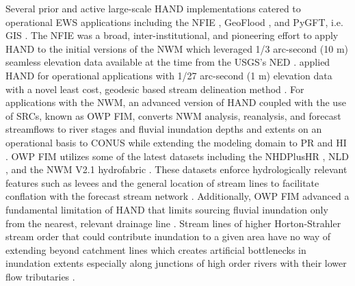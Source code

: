 \documentclass[water,article,submit,pdftex,moreauthors]{dependencies/Definitions/mdpi}
\begin{document}
Several prior and active large-scale \ac{HAND} implementations catered to operational \ac{EWS} applications including the \ac{NFIE} \cite{maidment2017conceptual,liu2016cybergis,liu2018cybergis}, GeoFlood \cite{zheng2018geoflood,hocini2021performance,d2022identification,carruthers2021assessment,zheng2022application}, and \ac{PyGFT}, i.e. \ac{GIS} \cite{petrochenkov2020pygft,verdin2016software}.
The \ac{NFIE} was a broad, inter-institutional, and pioneering effort to apply HAND to the initial versions of the \ac{NWM} which leveraged 1/3 arc-second (10 \ac{m}) seamless elevation data available at the time \cite{maidment2017conceptual,liu2016cybergis,liu2018cybergis} from the \ac{USGS}'s \ac{NED} \cite{gesch2002national,gesch2007digital}.
\citet{zheng2018geoflood} applied HAND for operational applications with 1/27 arc-second (1 \ac{m}) elevation data with a novel least cost, geodesic based stream delineation method \cite{passalacqua2010geometric,passalacqua2012automatic,zheng2018geoflood,zheng2019automatic,carruthers2021assessment,d2022identification,zheng2022application}.
For applications with the \ac{NWM}, an advanced version of \ac{HAND} coupled with the use of \acp{SRC}, known as \ac{OWP} \ac{FIM}, converts \ac{NWM} analysis, reanalysis, and forecast streamflows to river stages and fluvial inundation depths and extents on an operational basis to \ac{CONUS} while extending the modeling domain to \ac{PR} and \ac{HI} \cite{aristizabal2022extending,inundationMapping2022}.
\ac{OWP} \ac{FIM} utilizes some of the latest datasets including the \ac{NHDPlusHR} \cite{moore2019user}, \ac{NLD} \cite{engineers2016national}, and the \ac{NWM} \ac{V2.1} hydrofabric \cite{water2022nwm,noaa2016national,nwm2022hydrofabric,gochis2021wrf}.
These datasets enforce hydrologically relevant features such as levees and the general location of stream lines to facilitate conflation with the forecast stream network \cite{aristizabal2022extending,inundationMapping2022}.
Additionally, \ac{OWP} \ac{FIM} advanced a fundamental limitation of \ac{HAND} that limits sourcing fluvial inundation only from the nearest, relevant drainage line \cite{mcgehee2016modified,aristizabal2022extending,zhang2018comparative,li2022comparative,zheng2018geoflood,zheng2018river,nobre2016hand}.
Stream lines of higher Horton-Strahler stream order that could contribute inundation to a given area have no way of extending beyond catchment lines which creates artificial bottlenecks in inundation extents especially along junctions of high order rivers with their lower flow tributaries \cite{aristizabal2022extending,mcgehee2016modified}.
\end{document}
